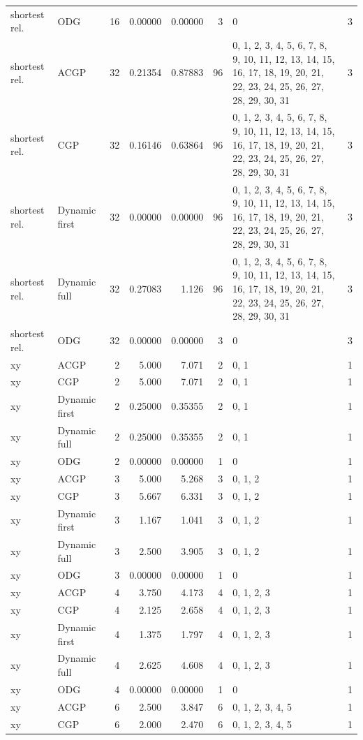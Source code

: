 \documentclass[10pt,a4paper]{article}
\begin{document}
\begin{longtable}{@{}p{23mm}p{29mm}rrrrp{36mm}r@{}}
shortest rel. & ODG & 16 & 0.00000 & 0.00000 & 3 & 0 & 3 \\
shortest rel. & ACGP & 32 & 0.21354 & 0.87883 & 96 & 0, 1, 2, 3, 4, 5, 6, 7, 8, 9, 10, 11, 12, 13, 14, 15, 16, 17, 18, 19, 20, 21, 22, 23, 24, 25, 26, 27, 28, 29, 30, 31 & 3 \\
shortest rel. & CGP & 32 & 0.16146 & 0.63864 & 96 & 0, 1, 2, 3, 4, 5, 6, 7, 8, 9, 10, 11, 12, 13, 14, 15, 16, 17, 18, 19, 20, 21, 22, 23, 24, 25, 26, 27, 28, 29, 30, 31 & 3 \\
shortest rel. & Dynamic first & 32 & 0.00000 & 0.00000 & 96 & 0, 1, 2, 3, 4, 5, 6, 7, 8, 9, 10, 11, 12, 13, 14, 15, 16, 17, 18, 19, 20, 21, 22, 23, 24, 25, 26, 27, 28, 29, 30, 31 & 3 \\
shortest rel. & Dynamic full & 32 & 0.27083 & 1.126 & 96 & 0, 1, 2, 3, 4, 5, 6, 7, 8, 9, 10, 11, 12, 13, 14, 15, 16, 17, 18, 19, 20, 21, 22, 23, 24, 25, 26, 27, 28, 29, 30, 31 & 3 \\
shortest rel. & ODG & 32 & 0.00000 & 0.00000 & 3 & 0 & 3 \\
xy & ACGP & 2 & 5.000 & 7.071 & 2 & 0, 1 & 1 \\
xy & CGP & 2 & 5.000 & 7.071 & 2 & 0, 1 & 1 \\
xy & Dynamic first & 2 & 0.25000 & 0.35355 & 2 & 0, 1 & 1 \\
xy & Dynamic full & 2 & 0.25000 & 0.35355 & 2 & 0, 1 & 1 \\
xy & ODG & 2 & 0.00000 & 0.00000 & 1 & 0 & 1 \\
xy & ACGP & 3 & 5.000 & 5.268 & 3 & 0, 1, 2 & 1 \\
xy & CGP & 3 & 5.667 & 6.331 & 3 & 0, 1, 2 & 1 \\
xy & Dynamic first & 3 & 1.167 & 1.041 & 3 & 0, 1, 2 & 1 \\
xy & Dynamic full & 3 & 2.500 & 3.905 & 3 & 0, 1, 2 & 1 \\
xy & ODG & 3 & 0.00000 & 0.00000 & 1 & 0 & 1 \\
xy & ACGP & 4 & 3.750 & 4.173 & 4 & 0, 1, 2, 3 & 1 \\
xy & CGP & 4 & 2.125 & 2.658 & 4 & 0, 1, 2, 3 & 1 \\
xy & Dynamic first & 4 & 1.375 & 1.797 & 4 & 0, 1, 2, 3 & 1 \\
xy & Dynamic full & 4 & 2.625 & 4.608 & 4 & 0, 1, 2, 3 & 1 \\
xy & ODG & 4 & 0.00000 & 0.00000 & 1 & 0 & 1 \\
xy & ACGP & 6 & 2.500 & 3.847 & 6 & 0, 1, 2, 3, 4, 5 & 1 \\
xy & CGP & 6 & 2.000 & 2.470 & 6 & 0, 1, 2, 3, 4, 5 & 1 \\

\end{longtable}
\end{document}
